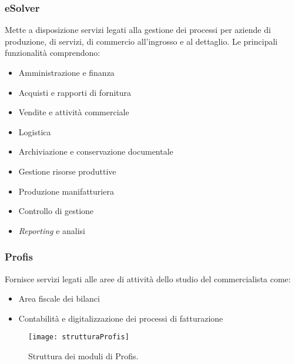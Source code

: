 \subsubsection*{eSolver}
Mette a disposizione servizi legati alla gestione dei processi per aziende di produzione, di servizi, di commercio all'ingrosso e al dettaglio. 
Le principali funzionalità comprendono: 
\begin{itemize}
    \item Amministrazione e finanza 
    \item Acquisti e rapporti di fornitura 
    \item Vendite e attività commerciale 
    \item Logistica
    \item Archiviazione e conservazione documentale
    \item Gestione risorse produttive 
    \item Produzione manifatturiera  
    \item Controllo di gestione 
    \item \emph{Reporting} e analisi 
\end{itemize}

\subsubsection*{Profis}
Fornisce servizi legati alle aree di attività dello studio del commercialista come: 
\begin{itemize}
    \item Area fiscale dei bilanci 
    \item Contabilità e digitalizzazione dei processi di fatturazione  
\end{itemize}
\begin{figure}[htbp] 
    \centering 
    \texttt{[image: strutturaProfis]}
    \caption{Struttura dei moduli di Profis.}
    \label{fig:strutturaProfis}
\end{figure}


